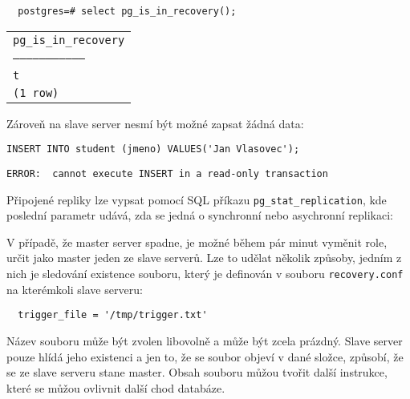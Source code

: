 \begin{lstlisting}
  postgres=# select pg_is_in_recovery();
\end{lstlisting}
    \begin{table}[H]
        \begin{center}
      \label{pgHba}
          \begin{tabular}{l}
            \texttt{pg\_is\_in\_recovery}\\
            \texttt{---------------------------------}\\
            \texttt{t}\\
            \texttt{(1 row)}\\
          \end{tabular}
        \end{center}
    \end{table}

Zároveň na slave server nesmí být možné zapsat žádná data:

\begin{lstlisting}
INSERT INTO student (jmeno) VALUES('Jan Vlasovec');
\end{lstlisting}
\begin{lstlisting}[keywordstyle=\color{black},identifierstyle=\color{black},stringstyle=\color{black}]
ERROR:  cannot execute INSERT in a read-only transaction
\end{lstlisting}

Připojené repliky lze vypsat pomocí SQL příkazu \texttt{pg\_stat\_replication}, kde poslední parametr udává, zda se jedná o synchronní nebo asychronní replikaci:



V případě, že master server spadne, je možné během pár minut vyměnit role, určit jako master jeden ze slave serverů. Lze to udělat několik způsoby, jedním z nich je sledování existence souboru, který je definován v souboru \texttt{recovery.conf} na kterémkoli slave serveru:

\begin{lstlisting}
  trigger_file = '/tmp/trigger.txt'
\end{lstlisting}

Název souboru může být zvolen libovolně a může být zcela prázdný. Slave server pouze hlídá jeho existenci a jen to, že se soubor objeví v dané složce, způsobí, že se ze slave serveru stane master. Obsah souboru můžou tvořit další instrukce, které se můžou ovlivnit další chod databáze. 

